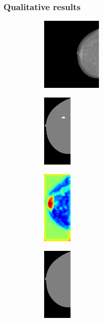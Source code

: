 \documentclass{beamer}
\begin{document}
	\begin{frame}
		\frametitle{Qualitative results}
		\begin{figure}[h]
		\centering
			\begin{subfigure}{0.25\textwidth}
				\centering
					\includegraphics[height=3.5cm]{plots/mammogram_ex1.png}
			\end{subfigure}
			\begin{subfigure}{0.16\textwidth}
				\centering
					\includegraphics[height=3.5cm]{plots/label_ex1.png}
			\end{subfigure}
			\begin{subfigure}{0.17\textwidth}
				\centering
					\includegraphics[height=3.5cm]{plots/logits_ex1_v1.png}
			\end{subfigure}
			\begin{subfigure}{0.22\textwidth}
				\centering
					\includegraphics[height=3.5cm]{plots/segmentation_ex1_v1.png}
			\end{subfigure}%
			\\
			\begin{subfigure}{0.25\textwidth}

\end{subfigure}
\end{figure}
\end{frame}
\end{document}
